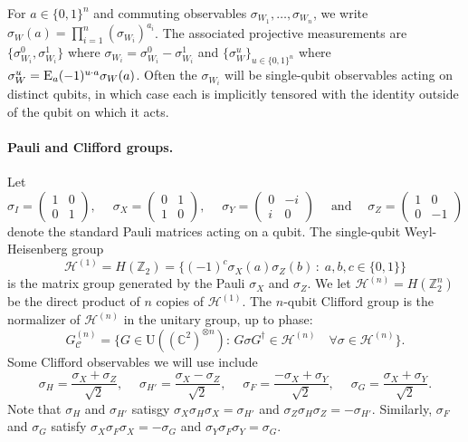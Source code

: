 \documentclass[11pt]{article}
\newcommand{\Es}[1]{\ensuremath{\mathop{\textsc{E}}}_{#1}}
\newcommand{\setft}[1]{\mathrm{#1}}
\newcommand{\Unitary}{\setft{U}}
\newcommand{\C}{\ensuremath{\mathbb{C}}}
\newcommand{\Z}{\ensuremath{\mathbb{Z}}}
\newcommand{\heisg}{{\mathcal{H}^{(1)}}}
\newcommand{\heisgn}{{\mathcal{H}^{(n)}}}
\newcommand{\cliffordn}{G_\mathcal{C}^{(n)}}
\begin{document}
For $a\in\{0,1\}^n$ and commuting observables $\sigma_{W_1},\ldots,\sigma_{W_n}$, we write $\sigma_W(a) = \prod_{i=1}^n (\sigma_{W_i})^{a_i}$. The associated projective measurements are $\{\sigma_{W_i}^0,\sigma_{W_i}^1\}$ where $\sigma_{W_i} = \sigma_{W_i}^0 - \sigma_{W_i}^1$ and $\{\sigma_W^u\}_{u\in\{0,1\}^n}$ where $\sigma_W^u = \Es{a} (-1)^{u\cdot a} \sigma_W(a)$.  Often the $\sigma_{W_i}$ will be single-qubit observables acting on distinct qubits, in which case each is implicitly tensored with the identity outside of the qubit on which it acts. 


\paragraph{Pauli and Clifford groups.}
Let 
\begin{equation}\label{eq:pauli-matrix}
\sigma_I = \begin{pmatrix} 1 & 0 \\ 0 & 1 \end{pmatrix},\quad\; \sigma_X = \begin{pmatrix} 0 & 1 \\ 1 & 0 \end{pmatrix},\quad\; \sigma_Y = \begin{pmatrix} 0 & -i \\ i & 0 \end{pmatrix}\quad\;\text{and}\quad\; \sigma_Z = \begin{pmatrix} 1 & 0 \\ 0 & -1\end{pmatrix}
\end{equation}
denote the standard Pauli matrices acting on a qubit.  The single-qubit Weyl-Heisenberg group
$$\heisg = H(\Z_2)=\Big\{(-1)^c\sigma_X(a)\sigma_Z(b)\,:\;a,b,c\in\{0,1\}\Big\} $$
is the matrix group generated by the Pauli $\sigma_X$ and $\sigma_Z$. We let $\heisgn = H(\Z_2^n)$ be the direct product of $n$ copies of $\heisg$.  
The $n$-qubit Clifford group is the normalizer of $\heisgn$ in the unitary group, up to phase: 
$$\cliffordn = \big\{G\in\Unitary((\C^2)^{\otimes n}):\, G \sigma G^\dagger \in \heisgn \quad\forall \sigma \in \heisgn\big\}.$$
Some Clifford observables we will use include 
\begin{equation}\label{eq:pauli-matrix-2}
 \sigma_H = \frac{\sigma_X+\sigma_Z}{\sqrt{2}},\quad\; \sigma_{H'} = \frac{\sigma_X-\sigma_Z}{\sqrt{2}},\quad\; \sigma_F = \frac{-\sigma_X+\sigma_Y}{\sqrt{2}},\quad\; \sigma_{G} = \frac{\sigma_X+\sigma_Y}{\sqrt{2}}.
\end{equation}
Note that  $\sigma_H$ and $\sigma_{H'}$ satisgy $\sigma_X \sigma_H \sigma_X = \sigma_{H'}$ and $\sigma_Z \sigma_H \sigma_Z = -\sigma_{H'}$. Similarly, $\sigma_F$ and $\sigma_G$ satisfy $\sigma_X \sigma_F \sigma_X = -\sigma_G$ and $\sigma_Y \sigma_F \sigma_Y = \sigma_G$. 
\end{document}
